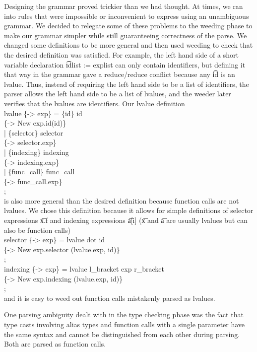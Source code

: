 \documentclass[11pt]{article}
\begin{document}
Designing the grammar proved trickier than we had thought. At times, we ran into rules that were impossible or inconvenient to express using an unambiguous grammar. We decided to relegate some of these problems to the weeding phase to make our grammar simpler while still guaranteeing correctness of the parse. We changed some definitions to be more general and then used weeding to check that the desired definition was satisfied. For example, the left hand side of a short variable declaration \t{idlist := explist} can only contain identifiers, but defining it that way in the grammar gave a reduce/reduce conflict because any \t{id} is an lvalue. Thus, instead of requiring the left hand side to be a list of identifiers, the parser allows the left hand side to be a list of lvalues, and the weeder later verifies that the lvalues are identifiers. Our lvalue definition 
\\[12pt]
\t{
lvalue \{-> exp\} = \{id\} id   \\
\{-> New exp.id(id)\} \\
| \{selector\} selector \\              
\{-> selector.exp\}\\
| \{indexing\} indexing\\               
\{-> indexing.exp\}\\
| \{func\_call\} func\_call \\
\{-> func\_call.exp\}\\
;
}
\\[12pt]
is also more general than the desired definition because function calls are not lvalues. We chose this definition because it allows for simple definitions of selector expressions \t{x.f} and indexing expressions \t{a[i]} (\t{x} and \t{a} are usually lvalues but can also be function calls)
\\[12pt]
\t{
selector \{-> exp\} = lvalue dot id\\
\{-> New exp.selector (lvalue.exp, id)\}\\
;
}\\
\t{
indexing \{-> exp\} = lvalue l\_bracket exp r\_bracket\\
\{-> New exp.indexing (lvalue.exp, id)\}\\
;
}
\\[12pt]
and it is easy to weed out function calls mistakenly parsed as lvalues.

One parsing ambiguity dealt with in the type checking phase was the fact that type casts involving alias types and function calls with a single parameter have the same syntax and cannot be distinguished from each other during parsing. Both are parsed as function calls.
\end{document}

